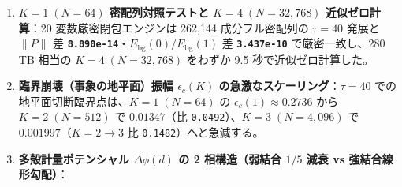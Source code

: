 \documentclass[
  a4paper,
]{ltjsarticle}
\providecommand{\tightlist}{%
  \setlength{\itemsep}{0pt}\setlength{\parskip}{0pt}}
\begin{document}
\begin{enumerate}
\def\labelenumi{\arabic{enumi}.}
\tightlist
\item
  \textbf{\(K=1\;(N=64)\) 密配列対照テストと \(K=4\;(N=32{,}768)\)
  近似ゼロ計算}：20 変数厳密閉包エンジンは 262,144 成分フル密配列の
  \(\tau = 40\) 発展と \(\|P\|\) 差
  \textbf{\texttt{8.890e-14}}・\(E_{\mathrm{bg}}(0)/E_{\mathrm{bg}}(1)\)
  差 \textbf{\texttt{3.437e-10}} で厳密一致し、280 TB 相当の
  \(K=4\;(N=32{,}768)\) をわずか 9.5 秒で近似ゼロ計算した。
\item
  \textbf{臨界崩壊（事象の地平面）振幅 \(\epsilon_c(K)\)
  の急激なスケーリング}：\(\tau = 40\)
  での地平面切断臨界点は、\(K=1\;(N=64)\) の
  \(\epsilon_c(1) \approx \mathbf{0.2736}\) から \(K=2\;(N=512)\) で
  \(\mathbf{0.01347}\)（比 \texttt{0.0492}）、\(K=3\;(N=4{,}096)\) で
  \(\mathbf{0.001997}\)（\(K=2\to 3\) 比 \texttt{0.1482}）へと急減する。
\item
  \textbf{多殻計量ポテンシャル \(\Delta\phi(d)\) の 2 相構造（弱結合
  \(1/5\) 減衰 vs 強結合線形勾配）}：


\end{enumerate}
\end{document}
